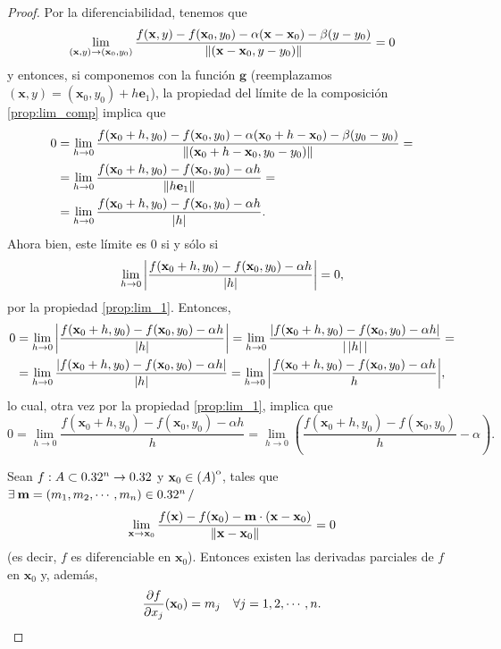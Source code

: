 \begin{theorem}
\begin{proof}
Por la diferenciabilidad, tenemos que 
\[
 \lim_{(\mathbf{x},y) \to (\mathbf{x}_0,y_0)} \frac{f(\mathbf{x},y) - f(\mathbf{x}_0,y_0) - \alpha(\mathbf{x} - \mathbf{x}_0) - \beta(y - y_0)}
                                 {\norm{(\mathbf{x} - \mathbf{x}_0, y - y_0)}} = 0
\]
y entonces, si componemos con la funci\'on $\mathbf{g}$ (reemplazamos $(\mathbf{x},y) = (\mathbf{x}_0,y_0) + h \mathbf{e}_1$), la propiedad del l\'imite de la composici\'on \eqref{prop:lim_comp} implica que
\begin{align*}
  0 & = \lim_{h \to 0} \frac{f(\mathbf{x}_0 + h,y_0) - f(\mathbf{x}_0,y_0) - \alpha(\mathbf{x}_0 + h - \mathbf{x}_0) - \beta(y_0 - y_0)}
                                 {\norm{(\mathbf{x}_0 + h - \mathbf{x}_0, y_0 - y_0)}} = \\
    & = \lim_{h \to 0} \frac{f(\mathbf{x}_0 + h,y_0) - f(\mathbf{x}_0,y_0) - \alpha h}{\norm{h \mathbf{e}_1}} = \\
    & = \lim_{h \to 0} \frac{f(\mathbf{x}_0 + h,y_0) - f(\mathbf{x}_0,y_0) - \alpha h}{\abs{h}} .
\end{align*}                                
Ahora bien, este l\'imite es $0$ si y s\'olo si
\[
 \lim_{h \to 0} \abs{ \frac{f(\mathbf{x}_0 + h,y_0) - f(\mathbf{x}_0,y_0) - \alpha h}{\abs{h}} } = 0,
\]
por la propiedad \eqref{prop:lim_1}. Entonces,
\begin{align*}
  0 & =  \lim_{h \to 0} \abs{ \frac{f(\mathbf{x}_0 + h,y_0) - f(\mathbf{x}_0,y_0) - \alpha h}{\abs{h}} }
      = \lim_{h \to 0} \frac{ \abs{ f(\mathbf{x}_0 + h,y_0) - f(\mathbf{x}_0,y_0) - \alpha h }}{\abs{ \, \abs{h} \, }} = \\
    & = \lim_{h \to 0} \frac{ \abs{ f(\mathbf{x}_0 + h,y_0) - f(\mathbf{x}_0,y_0) - \alpha h }}{\abs{h}}
      = \lim_{h \to 0} \abs{ \frac{ f(\mathbf{x}_0 + h,y_0) - f(\mathbf{x}_0,y_0) - \alpha h }{h}},
\end{align*} 
lo cual, otra vez por la propiedad \eqref{prop:lim_1}, implica que 
\[
 0 = \lim_{h \to 0} \frac{ f(\mathbf{x}_0 + h,y_0) - f(\mathbf{x}_0,y_0) - \alpha h }{h} =
     \lim_{h \to 0} \left( \frac{ f(\mathbf{x}_0 + h,y_0) - f(\mathbf{x}_0,y_0) }{h} - \alpha \right) .
\]
\fi

Sean $f: A \subset 0.32^n \to 0.32$ y $\mathbf{x}_0 \in {\kern0pt(A)}^{\mathrm{o}}$, tales que $\exists\: \mathbf{m} = (m_1, m_2, \cdots, m_n) \in 0.32^n \, /$
\[
 \lim_{\mathbf{x} \to \mathbf{x}_0} \frac{f(\mathbf{x}) - f(\mathbf{x}_0) - \mathbf{m} \cdot (\mathbf{x} - \mathbf{x}_0)}
                                 {\norm{\mathbf{x} - \mathbf{x}_0}} = 0
\]
(es decir, $f$ es diferenciable en $\mathbf{x}_0$). Entonces existen las derivadas parciales de $f$ en $\mathbf{x}_0$ y, adem\'as,
\[
 \dfrac{\partial f}{\partial x_j} (\mathbf{x}_0) = m_j \quad \forall j = 1, 2, \cdots, n.
\]


\end{proof}
\end{theorem}
